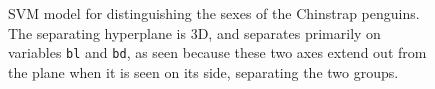 \documentclass[
  letterpaper,
]{krantz}
\begin{document}
\begin{figure}

\begin{minipage}{0.50\linewidth}



\end{minipage}%
%
\begin{minipage}{0.50\linewidth}



\end{minipage}%

\caption{\label{fig-p-svm-pdf}SVM model for distinguishing the sexes of
the Chinstrap penguins. The separating hyperplane is 3D, and separates
primarily on variables \texttt{bl} and \texttt{bd}, as seen because
these two axes extend out from the plane when it is seen on its side,
separating the two groups.}

\end{figure}%
\end{document}
